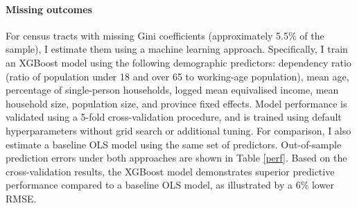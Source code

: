 \paragraph{Missing outcomes} For census tracts with missing Gini coefficients (approximately 5.5\% of the sample), I estimate them using a machine learning approach. Specifically, I train an XGBoost model using the following demographic predictors: dependency ratio (ratio of population under 18 and over 65 to working-age population), mean age, percentage of single-person households, logged mean equivalised income, mean household size, population size, and province fixed effects. Model performance is validated using a 5-fold cross-validation procedure, and is trained using default hyperparameters without grid search or additional tuning. For comparison, I also estimate a baseline OLS model using the same set of predictors. Out-of-sample prediction errors under both approaches are shown in Table \ref{perf}. Based on the cross-validation results, the XGBoost model demonstrates superior predictive performance compared to a baseline OLS model, as illustrated by a 6\% lower RMSE.

\begin{table}[H]
\centering
{}
\end{table}

